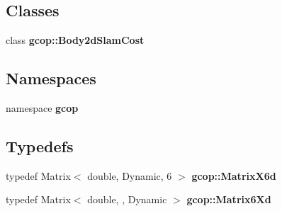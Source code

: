 \subsection*{\-Classes}
\begin{DoxyCompactItemize}
\item 
class {\bf gcop\-::\-Body2d\-Slam\-Cost}
\end{DoxyCompactItemize}
\subsection*{\-Namespaces}
\begin{DoxyCompactItemize}
\item 
namespace {\bf gcop}
\end{DoxyCompactItemize}
\subsection*{\-Typedefs}
\begin{DoxyCompactItemize}
\item 
typedef \-Matrix$<$ double, \*
\-Dynamic, 6 $>$ {\bf gcop\-::\-Matrix\-X6d}
\item 
typedef \-Matrix$<$ double, , \-Dynamic $>$ {\bf gcop\-::\-Matrix6\-Xd}
\end{DoxyCompactItemize}
